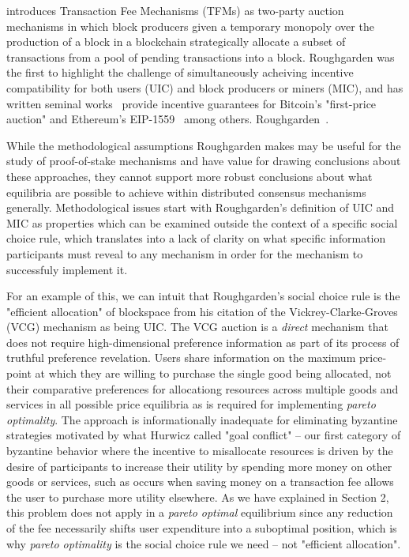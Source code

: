\documentclass[sigconf,anonymous]{aamas}
\begin{document}
\citet{roughgarden2021,roughgarden2024transaction} introduces Transaction Fee Mechanisms (TFMs) as two-party auction mechanisms in which block producers given a temporary monopoly over the production of a block in a blockchain strategically allocate a subset of transactions from a pool of pending transactions into a block. Roughgarden was the first to highlight the challenge of simultaneously acheiving incentive compatibility for both users (UIC) and block producers or miners (MIC), and has written seminal works~\cite {roughgarden2021,roughgarden2024transaction} provide incentive guarantees for Bitcoin's "first-price auction" and Ethereum's EIP-1559~\cite{buterin2019eip} among others. Roughgarden~\cite{roughgarden2021,roughgarden2024transaction}.

While the methodological assumptions Roughgarden makes may be useful for the study of proof-of-stake mechanisms and have value for drawing conclusions about these approaches, they cannot support more robust conclusions about what equilibria are possible to achieve within distributed consensus mechanisms generally. Methodological issues start with Roughgarden's definition of UIC and MIC as properties which can be examined outside the context of a specific social choice rule, which translates into a lack of clarity on what specific information participants must reveal to any mechanism in order for the mechanism to successfuly implement it.

For an example of this, we can intuit that Roughgarden's social choice rule is the "efficient allocation" of blockspace from his citation of the Vickrey-Clarke-Groves (VCG) mechanism as being UIC. The VCG auction is a \textit{direct} mechanism that does not require high-dimensional preference information as part of its process of truthful preference revelation. Users share information on the maximum price-point at which they are willing to purchase the single good being allocated, not their comparative preferences for allocationg resources across multiple goods and services in all possible price equilibria as is required for implementing \textit{pareto optimality}. The approach is informationally inadequate for eliminating byzantine strategies motivated by what Hurwicz called "goal conflict" -- our first category of byzantine behavior where the incentive to misallocate resources is driven by the desire of participants to increase their utility by spending more money on other goods or services, such as occurs when saving money on a transaction fee allows the user to purchase more utility elsewhere. As we have explained in Section 2, this problem does not apply in a \textit{pareto optimal} equilibrium since any reduction of the fee necessarily shifts user expenditure into a suboptimal position, which is why \textit{pareto optimality} is the social choice rule we need -- not "efficient allocation".
\end{document}
